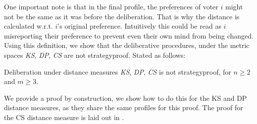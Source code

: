 One important note is that in the final profile, the
preferences of voter \(i\) might not be the same as it was
before the deliberation. That is why the distance is calculated
w.r.t. \(i\)'s original preference. Intuitively this could be
read as \(i\) misreporting their preference to prevent even
their own mind from being changed. Using this definition, we
show that the deliberative procedures, under the metric spaces
\emph{KS}, \emph{ DP}, \emph{ CS} are not strategyproof. Stated
as follows:

\begin{proposition} Deliberation under distance measures
	\emph{KS}, \emph{ DP}, \emph{ CS} is not strategyproof, for $n
		\geq 2$ and $m \geq 3$. \end{proposition} 

We provide a proof by construction, we show how to do this for
the KS and DP distance measures, as they share the same profiles for this proof. The
proof for the CS distance measure is laid out in .

